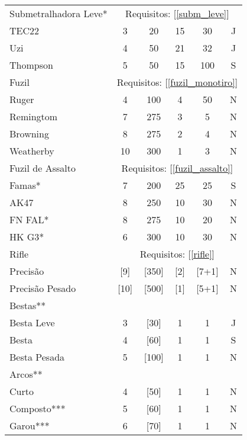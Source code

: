 \begin{table}[!ht]
\begin{tabular}{|l c c c c c|}
\rowcolor[HTML]{EFEFEF} 
Submetralhadora Leve*	& \multicolumn{5}{c|}{Requisitos: [\ref{subm_leve}]} \\
TEC22 			& 3 		& 20 			& 15 	& 30 	& J	 	\\
Uzi				& 4 		& 50 			& 21 	& 32 	& J 	\\
Thompson		& 5 		& 50 			& 15 	& 100 	& S 	\\

\rowcolor[HTML]{EFEFEF} 
Fuzil			& \multicolumn{5}{c|}{Requisitos: [\ref{fuzil_monotiro}]} \\
Ruger 			& 4 		& 100 			& 4 	& 50 	& N	 	\\
Remingtom		& 7 		& 275 			& 3 	& 5		& N 	\\
Browning		& 8 		& 275 			& 2 	& 4 	& N 	\\
Weatherby		& 10 		& 300 			& 1 	& 3		& N 	\\

\rowcolor[HTML]{EFEFEF} 
Fuzil de Assalto& \multicolumn{5}{c|}{Requisitos: [\ref{fuzil_assalto}]} \\
Famas* 			& 7 		& 200 			& 25 	& 25 	& S	 	\\
AK47			& 8 		& 250 			& 10 	& 30	& N 	\\
FN FAL*			& 8 		& 275 			& 10 	& 20 	& N 	\\
HK G3*			& 6 		& 300 			& 10 	& 30	& N 	\\

\rowcolor[HTML]{EFEFEF} 
Rifle			& \multicolumn{5}{c|}{Requisitos: [\ref{rifle}]} \\
Precisão		&	[9]		&	[350]		& [2] 	& [7+1] & N		\\
Precisão Pesado	&	[10]	&	[500]		& [1] 	& [5+1]	& N		\\

\rowcolor[HTML]{EFEFEF} 
Bestas**		&			&				&  		& 		&  		\\
Besta Leve		&	3		&	[30]		& 1 	& 	1	& J		\\
Besta			&	4		&	[60]		& 1 	& 	1	& S		\\
Besta Pesada	&	5		&	[100]		& 1 	& 	1	& N		\\

\rowcolor[HTML]{EFEFEF} 
Arcos**			&			&				&  		& 		&  		\\
Curto			&	4		&	[50]		& 1 	& 	1	& N		\\
Composto***		&	5		&	[60]		& 1 	& 	1	& N		\\
Garou***		&	6		&	[70]		& 1 	& 	1	& N		\\

\hline
\end{tabular}
\end{table}

